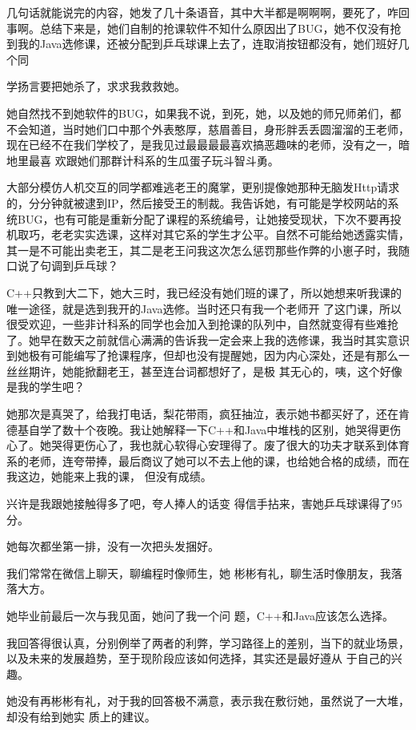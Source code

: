 \documentclass{article}
\begin{document}
几句话就能说完的内容，她发了几十条语音，其中大半都是啊啊啊，要死了，咋回事啊。总结下来是，她们自制的抢课软件不知什么原因出了BUG，她不仅没有抢到我的Java选修课，还被分配到乒乓球课上去了，连取消按钮都没有，她们班好几个同

\newpage
学扬言要把她杀了，求求我救救她。 

她自然找不到她软件的BUG，如果我不说，到死，她，以及她的师兄师弟们，都不会知道，当时她们口中那个外表憨厚，慈眉善目，身形胖丢丢圆溜溜的王老师，现在已经不在我们学校了，是我见过最最最最喜欢搞恶趣味的老师，没有之一，暗地里最喜
欢跟她们那群计科系的生瓜蛋子玩斗智斗勇。 

大部分模仿人机交互的同学都难逃老王的魔掌，更别提像她那种无脑发Http请求的，分分钟就被逮到IP，然后接受王的制裁。我告诉她，有可能是学校网站的系统BUG，也有可能是重新分配了课程的系统编号，让她接受现状，下次不要再投机取巧，老老实实选课，这样对其它系的学生才公平。自然不可能给她透露实情，其一是不可能出卖老王，其二是老王问我这次怎么惩罚那些作弊的小崽子时，我随
口说了句调到乒乓球？ 

C++只教到大二下，她大三时，我已经没有她们班的课了，所以她想来听我课的唯一途径，就是选到我开的Java选修。当时还只有我一个老师开
\newpage
了这门课，所以很受欢迎，一些非计科系的同学也会加入到抢课的队列中，自然就变得有些难抢了。她早在数天之前就信心满满的告诉我一定会来上我的选修课，我当时其实意识到她极有可能编写了抢课程序，但却也没有提醒她，因为内心深处，还是有那么一丝丝期许，她能掀翻老王，甚至连台词都想好了，是极
其无心的，咦，这个好像是我的学生吧？ 

她那次是真哭了，给我打电话，梨花带雨，疯狂抽泣，表示她书都买好了，还在肯德基自学了数十个夜晚。我让她解释一下C++和Java中堆栈的区别，她哭得更伤心了。她哭得更伤心了，我也就心软得心安理得了。废了很大的功夫才联系到体育系的老师，连夸带捧，最后商议了她可以不去上他的课，也给她合格的成绩，而在我这边，她能来上我的课，
但没有成绩。 

兴许是我跟她接触得多了吧，夸人捧人的话变
得信手拈来，害她乒乓球课得了95分。 


\newpage

她每次都坐第一排，没有一次把头发捆好。 


我们常常在微信上聊天，聊编程时像师生，她
彬彬有礼，聊生活时像朋友，我落落大方。 

她毕业前最后一次与我见面，她问了我一个问
题，C++和Java应该怎么选择。 

我回答得很认真，分别例举了两者的利弊，学习路径上的差别，当下的就业场景，以及未来的发展趋势，至于现阶段应该如何选择，其实还是最好遵从
于自己的兴趣。 

她没有再彬彬有礼，对于我的回答极不满意，表示我在敷衍她，虽然说了一大堆，却没有给到她实
质上的建议。 
\end{document}
